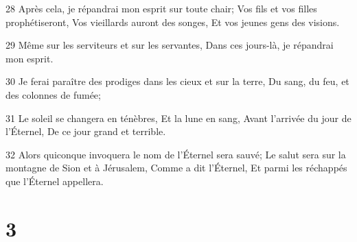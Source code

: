 \par 28 Après cela, je répandrai mon esprit sur toute chair; Vos fils et vos filles prophétiseront, Vos vieillards auront des songes, Et vos jeunes gens des visions.
\par 29 Même sur les serviteurs et sur les servantes, Dans ces jours-là, je répandrai mon esprit.
\par 30 Je ferai paraître des prodiges dans les cieux et sur la terre, Du sang, du feu, et des colonnes de fumée;
\par 31 Le soleil se changera en ténèbres, Et la lune en sang, Avant l'arrivée du jour de l'Éternel, De ce jour grand et terrible.
\par 32 Alors quiconque invoquera le nom de l'Éternel sera sauvé; Le salut sera sur la montagne de Sion et à Jérusalem, Comme a dit l'Éternel, Et parmi les réchappés que l'Éternel appellera.

\chapter{3}

